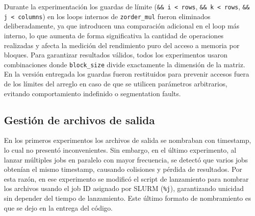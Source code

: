 \documentclass[11pt,a4paper]{article}
\begin{document}
Durante la experimentación los guardas de límite (\texttt{\&\& i < rows}, \texttt{\&\& k < rows}, \texttt{\&\& j < columns}) en los loops internos de \texttt{zorder\_mul} fueron eliminados deliberadamente, ya que introducen una comparación adicional en el loop más interno, lo que aumenta de forma significativa la cantidad de operaciones realizadas y afecta la medición del rendimiento puro del acceso a memoria por bloques. Para garantizar resultados válidos, todos los experimentos usaron combinaciones donde \texttt{block\_size} divide exactamente la dimensión de la matriz. En la versión entregada los guardas fueron restituidos para prevenir accesos fuera de los límites del arreglo en caso de que se utilicen parámetros arbitrarios, evitando comportamiento indefinido o segmentation faults.

\subsection{Gestión de archivos de salida}

En los primeros experimentos los archivos de salida se nombraban con timestamp, lo cual no presentó inconvenientes. Sin embargo, en el último experimento, al lanzar múltiples jobs en paralelo con mayor frecuencia, se detectó que varios jobs obtenían el mismo timestamp, causando colisiones y pérdida de resultados. Por esta razón, en ese experimento se modificó el script de lanzamiento para nombrar los archivos usando el job ID asignado por SLURM (\texttt{\%j}), garantizando unicidad sin depender del tiempo de lanzamiento. Este último formato de nombramiento es que se dejo en la entrega del código.



 

\end{document}
